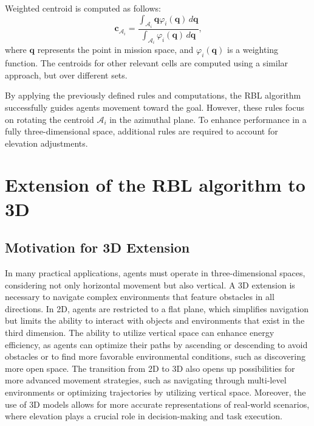         Weighted centroid is computed as follows:        
        \begin{equation}
            \mathbf{c}_{\mathcal{A}_i} = \frac{\int_{\mathcal{A}_i} \mathbf{q} \varphi_i(\mathbf{q}) \, d\mathbf{q}}{\int_{\mathcal{A}_i} \varphi_i(\mathbf{q}) \, d\mathbf{q}}\text{,}
        \end{equation}
        where \( \mathbf{q} \) represents the point in mission space, and \( \varphi_i(\mathbf{q}) \) is a weighting function. 
        The centroids for other relevant cells are computed using a similar approach, but over different sets.

        By applying the previously defined rules and computations, the RBL algorithm successfully guides agents movement toward the goal.
        However, these rules focus on rotating the centroid $\mathcal{A}_i$ in the azimuthal plane. 
        To enhance performance in a fully three-dimensional space, additional rules are required to account for elevation adjustments. 

\section{Extension of the RBL algorithm to 3D}
    \subsection{Motivation for 3D Extension}
        In many practical applications, agents must operate in three-dimensional spaces, considering not only horizontal movement but also vertical.
        A \ac{3D} extension is necessary to navigate complex environments that feature obstacles in all directions.
        In \ac{2D}, agents are restricted to a flat plane, which simplifies navigation but limits the ability to interact with objects and environments that exist in the third dimension.
        The ability to utilize vertical space can enhance energy efficiency, as agents can optimize their paths by ascending or descending to avoid obstacles or to find more favorable environmental conditions, such as discovering more open space.
        The transition from \ac{2D} to \ac{3D} also opens up possibilities for more advanced movement strategies, such as navigating through multi-level environments or optimizing trajectories by utilizing vertical space.  
        Moreover, the use of \ac{3D} models allows for more accurate representations of real-world scenarios, where elevation plays a crucial role in decision-making and task execution.


